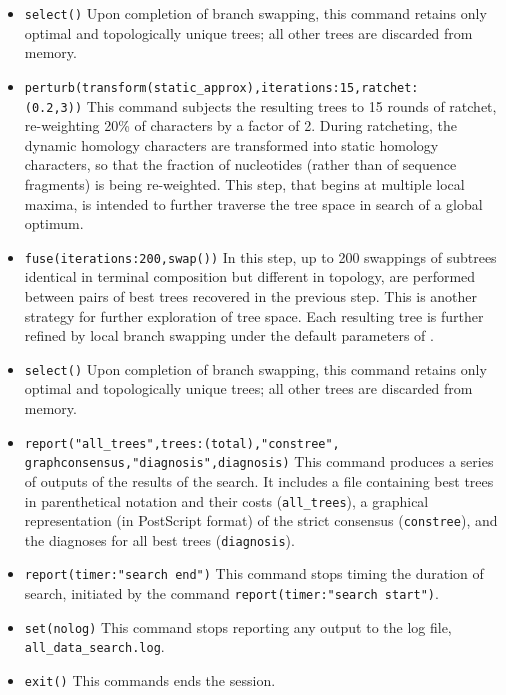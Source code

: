 \begin{itemize}
\item \texttt{select()} Upon completion of branch swapping, this command retains only optimal and topologically unique trees; all other trees are discarded from memory. 
\item \texttt{perturb(transform(static\_approx),iterations:15,ratchet:\\(0.2,3))} This command subjects the resulting trees to 15 rounds of ratchet, re-weighting 20\% of characters by a factor of 2. During ratcheting, the dynamic homology characters are transformed into static homology characters, so that the fraction of nucleotides (rather than of sequence fragments) is being re-weighted. This step, that begins at multiple local maxima, is intended to further traverse the tree space in search of a global optimum.
\item \texttt{fuse(iterations:200,swap())} In this step, up to 200 swappings of subtrees identical in terminal composition but different in topology, are performed between pairs of best trees recovered in the previous step. This is another strategy for further exploration of tree space. Each resulting tree is further refined by local branch swapping under the default parameters of .
\item \texttt{select()} Upon completion of branch swapping, this command retains only optimal and topologically unique trees; all other trees are discarded from memory.
\item \texttt{report("all\_trees",trees:(total),"constree",\\graphconsensus,"diagnosis",diagnosis)} This command produces a series of outputs of the results of the search. It includes a file containing best trees in parenthetical notation and their costs (\texttt{all\_trees}), a graphical representation (in PostScript format) of the strict consensus (\texttt{constree}), and the diagnoses for all best trees (\texttt{diagnosis}).
\item \texttt{report(timer:"search end")} This command stops timing the duration of search, initiated by the command \texttt{report(timer:"search start")}.
\item \texttt{set(nolog)} This command stops reporting any output to the log file, \texttt{all\_data\_search.log}.
\item \texttt{exit()} This commands ends the \poy session.
\end{itemize}

